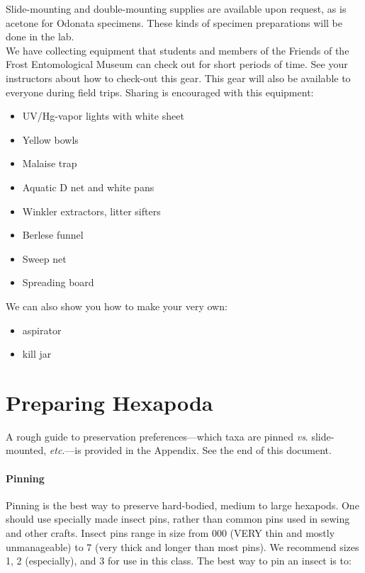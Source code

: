 \documentclass[letterpaper, 11pt]{article}
\begin{document}
Slide-mounting and double-mounting supplies are available upon request, as is acetone for Odonata specimens. These kinds of specimen preparations will be done in the lab.\\

We have collecting equipment that students and members of the Friends of the Frost Entomological Museum can check out for short periods of time. See your instructors about how to check-out this gear. This gear will also be available to everyone during field trips. Sharing is encouraged with this equipment:

\begin{itemize}
\item UV/Hg-vapor lights with white sheet
\item Yellow bowls
\item Malaise trap
\item Aquatic D net and white pans
\item Winkler extractors, litter sifters
\item Berlese funnel
\item Sweep net
\item Spreading board
\end{itemize}

We can also show you how to make your very own:
 
\begin{itemize}
\item aspirator
\item kill jar
\end{itemize}


\section*{Preparing Hexapoda}
A rough guide to preservation preferences---which taxa are pinned \textit{vs}. slide-mounted, \textit{etc}.---is provided in the Appendix. See the end of this document.

\paragraph*{Pinning} Pinning is the best way to preserve hard-bodied, medium to large hexapods. One should use specially made insect pins, rather than common pins used in sewing and other crafts. Insect pins range in size from 000 (VERY thin and mostly unmanageable) to 7 (very thick and longer than most pins). We recommend sizes 1, 2 (especially), and 3 for use in this class. The best way to pin an insect is to:
 
\end{document}
